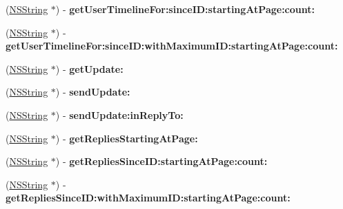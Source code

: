 \begin{DoxyCompactItemize}
\item 
\hypertarget{interface_m_g_twitter_engine_a54684be9ec4e9eedf6e501824b986b20}{
(\hyperlink{class_n_s_string}{\-N\-S\-String} $\ast$) -\/ {\bfseries get\-User\-Timeline\-For\-:since\-I\-D\-:starting\-At\-Page\-:count\-:}}
\label{interface_m_g_twitter_engine_a54684be9ec4e9eedf6e501824b986b20}

\item 
\hypertarget{interface_m_g_twitter_engine_abc3afd27a25718d85c971168a395917e}{
(\hyperlink{class_n_s_string}{\-N\-S\-String} $\ast$) -\/ {\bfseries get\-User\-Timeline\-For\-:since\-I\-D\-:with\-Maximum\-I\-D\-:starting\-At\-Page\-:count\-:}}
\label{interface_m_g_twitter_engine_abc3afd27a25718d85c971168a395917e}

\item 
\hypertarget{interface_m_g_twitter_engine_a6e76154597c9aa014d2312e3ffbc191a}{
(\hyperlink{class_n_s_string}{\-N\-S\-String} $\ast$) -\/ {\bfseries get\-Update\-:}}
\label{interface_m_g_twitter_engine_a6e76154597c9aa014d2312e3ffbc191a}

\item 
\hypertarget{interface_m_g_twitter_engine_afec750c02977315eb3e938aacadcb6cd}{
(\hyperlink{class_n_s_string}{\-N\-S\-String} $\ast$) -\/ {\bfseries send\-Update\-:}}
\label{interface_m_g_twitter_engine_afec750c02977315eb3e938aacadcb6cd}

\item 
\hypertarget{interface_m_g_twitter_engine_a2b93cebbb4800a9b57cd9917e67a08e5}{
(\hyperlink{class_n_s_string}{\-N\-S\-String} $\ast$) -\/ {\bfseries send\-Update\-:in\-Reply\-To\-:}}
\label{interface_m_g_twitter_engine_a2b93cebbb4800a9b57cd9917e67a08e5}

\item 
\hypertarget{interface_m_g_twitter_engine_a2a34493b9e5aaae1e50eadfc2d250cd7}{
(\hyperlink{class_n_s_string}{\-N\-S\-String} $\ast$) -\/ {\bfseries get\-Replies\-Starting\-At\-Page\-:}}
\label{interface_m_g_twitter_engine_a2a34493b9e5aaae1e50eadfc2d250cd7}

\item 
\hypertarget{interface_m_g_twitter_engine_a6993baa657462b92541e9a841d0af0ba}{
(\hyperlink{class_n_s_string}{\-N\-S\-String} $\ast$) -\/ {\bfseries get\-Replies\-Since\-I\-D\-:starting\-At\-Page\-:count\-:}}
\label{interface_m_g_twitter_engine_a6993baa657462b92541e9a841d0af0ba}

\item 
\hypertarget{interface_m_g_twitter_engine_a2c707b99a30991a0ab0757e79fcc7192}{
(\hyperlink{class_n_s_string}{\-N\-S\-String} $\ast$) -\/ {\bfseries get\-Replies\-Since\-I\-D\-:with\-Maximum\-I\-D\-:starting\-At\-Page\-:count\-:}}
\label{interface_m_g_twitter_engine_a2c707b99a30991a0ab0757e79fcc7192}


\end{DoxyCompactItemize}
